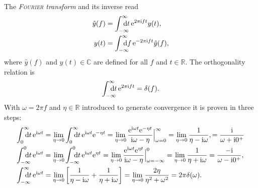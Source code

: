 The \emph{\textsc{Fourier} transform} and its inverse read
%
\begin{align*}
    \hat y(f) &= \int \from{-\infty} \till \infty
    \D t \, \E^{2 \pi \I f t} y(t),
    \\
    y(t) &= \int \from{-\infty} \till \infty
    \D f \, \E^{-2 \pi \I f t} \hat y(f),
\end{align*}
%
where $\hat y(f)$ and $y(t) \in \mathds C$ are defined for all $f$ and $t \in
\mathds R$. The orthogonality relation is
%
\begin{equation*}
    \int \from{-\infty} \till \infty \D t \, \E^{2 \pi \I f t} = \delta(f).
\end{equation*}
%
With $\omega = 2 \pi f$ and $\eta \in \mathds R$ introduced to generate
convergence it is proven in three steps:
%
\begin{subequations}
    \begin{align}
        \label{int+ dt exp(i omega t)}
        \int \from 0 \till \infty \D t \, \E^{\I \omega t}
        &= \lim_{\eta \rightarrow 0}
            \int \from 0 \till \infty \D t \, \E^{\I \omega t} \E^{-\eta t}
        = \lim_{\eta \rightarrow 0}
            \frac{\E^{\I \omega t} \E^{-\eta t}}{\I \omega - \eta}
            \Big|_{\omega = 0}^\infty
        = \lim_{\eta \rightarrow 0} \frac 1 {\eta - \I \omega},
        = \frac \I {\omega + \I 0^+}
        \\
        \label{int- dt exp(i omega t)}
        \int \from{-\infty} \till 0 \D t \, \E^{\I \omega t}
        &= \lim_{\eta \rightarrow 0}
            \int \from{-\infty} \till 0 \D t \, \E^{\I \omega t} \E^{\eta t}
        = \lim_{\eta \rightarrow 0}
            \frac{\E^{\I \omega t} \E^{\eta t}}{\I \omega - \eta}
            \Big|_{\omega = -\infty}^0
        = \lim_{\eta \rightarrow 0} \frac 1 {\eta + \I \omega}
        = \frac{-\I}{\omega - \I 0^+},
        \\
        \label{int dt exp(i omega t)}
        \int \from{-\infty} \till \infty \D t \, \E^{\I \omega t}
        &= \lim_{\eta \rightarrow 0} \left[
            \frac 1 {\eta - \I \omega} + \frac 1 {\eta + \I \omega} \right]
        = \lim_{\eta \rightarrow 0} \frac{2 \eta}{\eta^2 + \omega^2}
        = 2 \pi \delta(\omega).
    \end{align}
\end{subequations}
